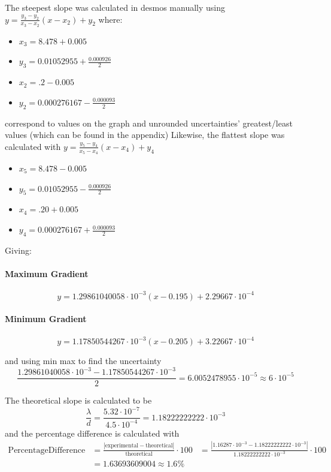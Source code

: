 \documentclass[12pt]{article}
\begin{document}
The steepest slope was calculated in desmos manually using $y = \frac{y_{3}-y_{2}}{x_{3}-x_{2}}\left(x-x_{2}\right) + y_{2}$
where:
\begin{itemize}
    \item $x_{3}=8.478+0.005$
    \item $y_{3}=0.01052955+\frac{0.000926}{2}$
    \item $x_{2}=.2-0.005$
    \item $y_{2}=0.000276167-\frac{0.000093}{2}$
\end{itemize}
correspond to values on the graph and unrounded uncertainties' greatest/least values (which can be found in the appendix)
Likewise, the flattest slope was calculated with $y=\frac{y_{5}-y_{4}}{x_{5}-x_{4}}\left(x-x_{4}\right)+y_{4}$
\begin{itemize}
    \item $x_{5}=8.478-0.005$
    \item $y_{5}=0.01052955-\frac{0.000926}{2}$
    \item $x_{4}=.20+0.005$
    \item $y_{4}=0.000276167+\frac{0.000093}{2}$
\end{itemize}
Giving:

\paragraph{Maximum Gradient} 
\begin{equation}
    y=1.29861040058\cdot10^{-3}\left(x-0.195\right)+2.29667\cdot10^{-4}
\end{equation}
\paragraph{Minimum Gradient} 
\begin{equation}
    y=1.17850544267\cdot10^{-3}\left(x-0.205\right)+3.22667\cdot10^{-4}
\end{equation}

and using min max to find the uncertainty
\begin{equation}
    \frac{1.29861040058\cdot10^{-3} - 1.17850544267\cdot10^{-3}}{2} = 6.0052478955\cdot10^{-5} \approx 6\cdot10^{-5}
\end{equation}

The theoretical slope is calculated to be
\begin{equation}
    \frac{\lambda}{d} = \frac{5.32\cdot10^{-7}}{4.5\cdot10^{-4}} = 1.18222222222\cdot10^{-3}
\end{equation}
and the percentage difference is calculated with
\begin{align}
    \mathrm{Percentage Difference} &=  \frac{|\mathrm{experimental} - \mathrm{theoretical}|}{\mathrm{theoretical}} \cdot  100
                                   &= \frac{|1.16287\cdot10^{-3} - 1.18222222222\cdot10^{-3}|}{1.18222222222\cdot10^{-3}} \cdot 100 \\
                                   &= 1.63693609004 \approx 1.6 \%
\end{align}
\end{document}
